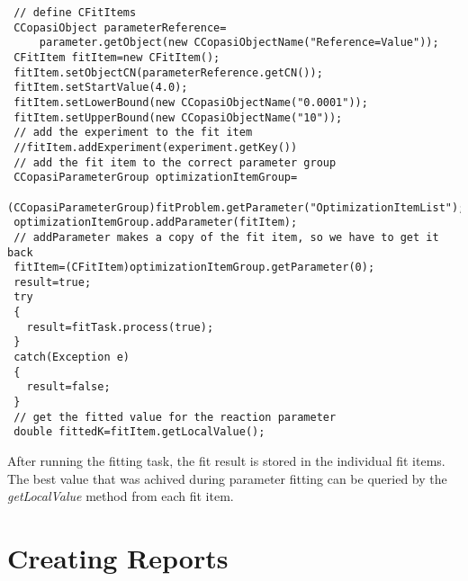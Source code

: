 \documentclass[a4,10pt]{article}
\begin{document}
\begin{lstlisting}
 // define CFitItems
 CCopasiObject parameterReference=
     parameter.getObject(new CCopasiObjectName("Reference=Value"));
 CFitItem fitItem=new CFitItem();
 fitItem.setObjectCN(parameterReference.getCN());
 fitItem.setStartValue(4.0);
 fitItem.setLowerBound(new CCopasiObjectName("0.0001"));
 fitItem.setUpperBound(new CCopasiObjectName("10"));
 // add the experiment to the fit item
 //fitItem.addExperiment(experiment.getKey())
 // add the fit item to the correct parameter group
 CCopasiParameterGroup optimizationItemGroup=
     (CCopasiParameterGroup)fitProblem.getParameter("OptimizationItemList");
 optimizationItemGroup.addParameter(fitItem);
 // addParameter makes a copy of the fit item, so we have to get it back
 fitItem=(CFitItem)optimizationItemGroup.getParameter(0);
 result=true;
 try
 {
   result=fitTask.process(true);
 }
 catch(Exception e)
 {
   result=false;
 }
 // get the fitted value for the reaction parameter
 double fittedK=fitItem.getLocalValue();
\end{lstlisting}

After running the fitting task, the fit result is stored in the individual fit items. The best value that was achived during parameter fitting can be queried by the \textit{getLocalValue} method from each fit item.

\section{Creating Reports}
\label{CreatingReports}
\end{document}
